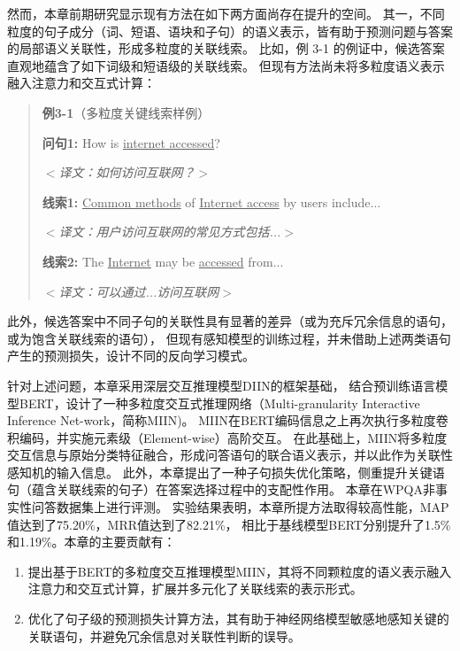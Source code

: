 然而，本章前期研究显示现有方法在如下两方面尚存在提升的空间。
其一，不同粒度的句子成分（词、短语、语块和子句）的语义表示，皆有助于预测问题与答案的局部语义关联性，形成多粒度的关联线索。
比如，例 3-1 的例证中，候选答案直观地蕴含了如下词级和短语级的关联线索。
但现有方法尚未将多粒度语义表示融入注意力和交互式计算：
\begin{quotation}
    \noindent \textbf{\songti 例3-1}（多粒度关键线索样例）
    
    \noindent \textbf{问句1:} How is \underline{internet accessed}?
    
    \noindent $<$\textit{译文：如何访问互联网？}$>$
    
    \noindent \textbf{线索1:} \underline{Common methods} of \underline{Internet access} by users include...
    
    \noindent $<$\textit{译文：用户访问互联网的常见方式包括...}$>$

    \noindent \textbf{线索2:} The \underline{Internet} may be \underline{accessed} from...
    
    \noindent $<$\textit{译文：可以通过...访问互联网}$>$
    
\end{quotation}
此外，候选答案中不同子句的关联性具有显著的差异（或为充斥冗余信息的语句，或为饱含关联线索的语句），
但现有感知模型的训练过程，并未借助上述两类语句产生的预测损失，设计不同的反向学习模式。

针对上述问题，本章采用深层交互推理模型DIIN\cite{gong2017natural}的框架基础，
结合预训练语言模型BERT，设计了一种多粒度交互式推理网络（Multi-granularity Interactive Inference Net-work，简称MIIN)。
MIIN在BERT编码信息之上再次执行多粒度卷积编码，并实施元素级（Element-wise）高阶交互。
在此基础上，MIIN将多粒度交互信息与原始分类特征融合，形成问答语句的联合语义表示，并以此作为关联性感知机的输入信息。
此外，本章提出了一种子句损失优化策略，侧重提升关键语句（蕴含关联线索的句子）在答案选择过程中的支配性作用。
本章在WPQA非事实性问答数据集上进行评测。
实验结果表明，本章所提方法取得较高性能，MAP值达到了75.20\%，MRR值达到了82.21\%，
相比于基线模型BERT分别提升了1.5\%和1.19\%。本章的主要贡献有：

\begin{enumerate}
    \item 
    提出基于BERT的多粒度交互推理模型MIIN，其将不同颗粒度的语义表示融入注意力和交互式计算，扩展并多元化了关联线索的表示形式。
    \item 
    优化了句子级的预测损失计算方法，其有助于神经网络模型敏感地感知关键的关联语句，并避免冗余信息对关联性判断的误导。
\end{enumerate}

